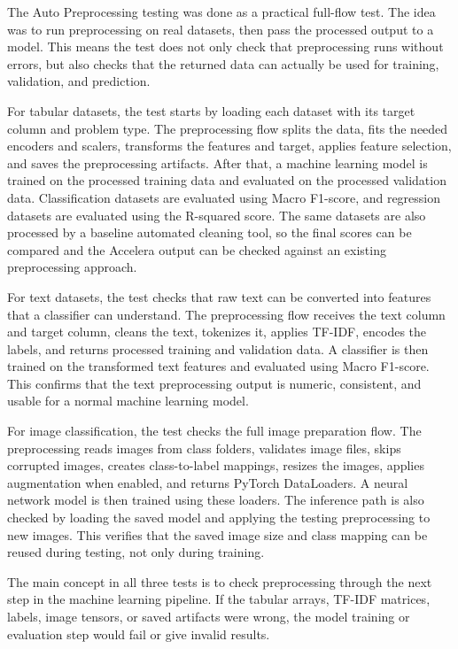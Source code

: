 \documentclass[12pt,a4paper]{report}
\begin{document}
The Auto Preprocessing testing was done as a practical full-flow test. The idea
was to run preprocessing on real datasets, then pass the processed output to a
model. This means the test does not only check that preprocessing runs without
errors, but also checks that the returned data can actually be used for
training, validation, and prediction.

\noindent For tabular datasets, the test starts by loading each dataset with its
target column and problem type. The preprocessing flow splits the data, fits the
needed encoders and scalers, transforms the features and target, applies feature
selection, and saves the preprocessing artifacts. After that, a machine learning
model is trained on the processed training data and evaluated on the processed
validation data. Classification datasets are evaluated using Macro F1-score,
and regression datasets are evaluated using the R-squared score. The same
datasets are also processed by a baseline automated cleaning tool, so the final
scores can be compared and the Accelera output can be checked against an
existing preprocessing approach.

\noindent For text datasets, the test checks that raw text can be converted into
features that a classifier can understand. The preprocessing flow receives the
text column and target column, cleans the text, tokenizes it, applies TF-IDF,
encodes the labels, and returns processed training and validation data. A
classifier is then trained on the transformed text features and evaluated using
Macro F1-score. This confirms that the text preprocessing output is numeric,
consistent, and usable for a normal machine learning model.

\noindent For image classification, the test checks the full image preparation
flow. The preprocessing reads images from class folders, validates image files,
skips corrupted images, creates class-to-label mappings, resizes the images,
applies augmentation when enabled, and returns PyTorch DataLoaders. A neural
network model is then trained using these loaders. The inference path is also
checked by loading the saved model and applying the testing preprocessing to new
images. This verifies that the saved image size and class mapping can be reused
during testing, not only during training.

\noindent The main concept in all three tests is to check preprocessing through
the next step in the machine learning pipeline. If the tabular arrays, TF-IDF
matrices, labels, image tensors, or saved artifacts were wrong, the model
training or evaluation step would fail or give invalid results. 
\end{document}
